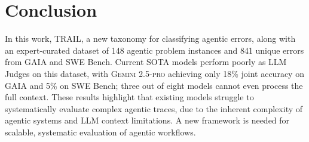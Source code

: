 \section{Conclusion}

In this work, \textsc{TRAIL}, a new taxonomy for classifying agentic errors, along with an expert-curated dataset of 148 agentic problem instances and 841 unique errors from GAIA and SWE Bench. Current SOTA models perform poorly as LLM Judges on this dataset, with \textsc{Gemini 2.5-pro} achieving only 18\% joint accuracy on GAIA and 5\% on SWE Bench; three out of eight models cannot even process the full context. These results highlight that existing models struggle to systematically evaluate complex agentic traces, due to the inherent complexity of agentic systems and LLM context limitations. A new framework is needed for scalable, systematic evaluation of agentic workflows.